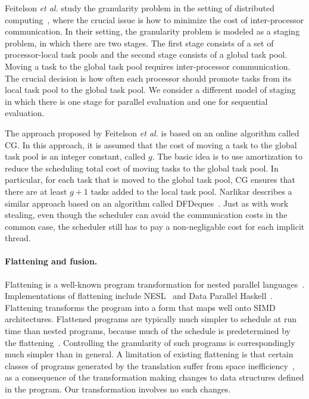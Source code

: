 Feitelson \textit{et al.} study the granularity problem in the setting
of distributed computing~\cite{aharoni92arun-time}, where the crucial
issue is how to minimize the cost of inter-processor communication. In
their setting, the granularity problem is modeled as a staging
problem, in which there are two stages. The first stage consists of a
set of processor-local task pools and the second stage consists of a
global task pool. Moving a task to the global task pool requires
inter-processor communication. The crucial decision is how often each
processor should promote tasks from its local task pool to the global
task pool. We consider a different model of staging in which there is
one stage for parallel evaluation and one for sequential
evaluation. 

The approach proposed by Feitelson \textit{et al.} is based on an
online algorithm called CG. In this approach, it is assumed that the
cost of moving a task to the global task pool is an integer constant,
called $g$. The basic idea is to use amortization to reduce the
scheduling total cost of moving tasks to the global task pool. In
particular, for each task that is moved to the global task pool, CG
ensures that there are at least $g+1$ tasks added to the local task
pool. Narlikar describes a similar approach based on an algorithm
called DFDeques~\cite{Narlikar99}. Just as with work
stealing, even though the scheduler can avoid the communication costs
in the common case, the scheduler still has to pay a non-negligable
cost for each implicit thread.

\paragraph{Flattening and fusion.}

Flattening is a well-known program transformation for nested parallel
languages~\cite{Blelloch:1990:CCL:78246.78250}. Implementations of
flattening include NESL~\cite{nesl-implement} and Data Parallel
Haskell~\cite{PeytonJones08}. Flattening transforms the program into a
form that maps well onto SIMD architectures. Flattened programs are
typically much simpler to schedule at run time than nested programs,
because much of the schedule is predetermined by the
flattening~\cite{spoonhower:phd}. Controlling the
granularity of such programs is correspondingly much simpler than in
general. A limitation of existing flattening is that certain classes
of programs generated by the translation suffer from space
inefficiency~\cite{BlellochGr96}, as a consequence of the
transformation making changes to data structures defined in the
program. Our transformation involves no such changes.

